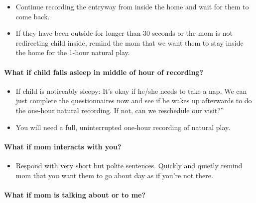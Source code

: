 \documentclass[
]{book}
\providecommand{\tightlist}{%
  \setlength{\itemsep}{0pt}\setlength{\parskip}{0pt}}
\begin{document}
\begin{itemize}
\tightlist
\item
  Continue recording the entryway from inside the home and wait for them to come back.
\item
  If they have been outside for longer than 30 seconds or the mom is not redirecting child inside, remind the mom that we want them to stay inside the home for the 1-hour natural play.
\end{itemize}

\hypertarget{what-if-child-falls-asleep-in-middle-of-hour-of-recording}{%
\paragraph*{What if child falls asleep in middle of hour of recording?}\label{what-if-child-falls-asleep-in-middle-of-hour-of-recording}}

\begin{itemize}
\tightlist
\item
  If child is noticeably sleepy: It's okay if he/she needs to take a nap. We can just complete the questionnaires now and see if he wakes up afterwards to do the one-hour natural recording. If not, can we reschedule our visit?''
\item
  You will need a full, uninterrupted one-hour recording of natural play.
\end{itemize}

\hypertarget{what-if-mom-interacts-with-you}{%
\paragraph*{What if mom interacts with you?}\label{what-if-mom-interacts-with-you}}

\begin{itemize}
\tightlist
\item
  Respond with very short but polite sentences. Quickly and quietly remind mom that you want them to go about day as if you're not there.
\end{itemize}

\hypertarget{what-if-mom-is-talking-about-or-to-me}{%
\paragraph*{What if mom is talking about or to me?}\label{what-if-mom-is-talking-about-or-to-me}}
\end{document}
